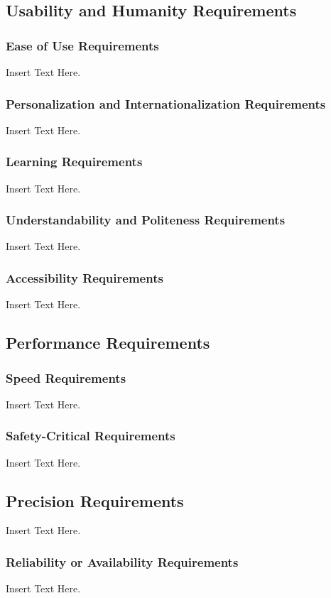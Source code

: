 \documentclass [12pt]{article}
\begin{document}
\subsection{Usability and Humanity Requirements} 
\subsubsection{Ease of Use Requirements}
Insert Text Here.

\subsubsection{Personalization and Internationalization Requirements}
Insert Text Here.

\subsubsection{Learning Requirements }
Insert Text Here.

\subsubsection{Understandability and Politeness Requirements}
Insert Text Here.
		
\subsubsection{Accessibility Requirements }
Insert Text Here.
 
\subsection{Performance Requirements}
\subsubsection{Speed Requirements }
Insert Text Here. 

\subsubsection{Safety-Critical Requirements }
		Insert Text Here. 	

\subsection{Precision Requirements}
		Insert Text Here.

\subsubsection{Reliability or Availability  Requirements}
		Insert Text Here.
\end{document}
